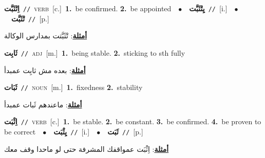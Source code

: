 \documentclass[10pt,a4paper,twoside]{article} %
\begin{document}
\begin{multicols}{2}
{\setlength\topsep{0pt}\textbf{\foreignlanguage{arabic}{اِتْثَبَّت}}\ {\color{gray}\texttt{//}\color{black}}\ \textsc{verb}\ [c.]\ \textbf{1.}~be confirmed.  \textbf{2.}~be appointed\ \ $\bullet$\ \ \setlength\topsep{0pt}\textbf{\foreignlanguage{arabic}{يِتْثَبَّت}}\ {\color{gray}\texttt{//}\color{black}}\ [i.]\ \ $\bullet$\ \ \setlength\topsep{0pt}\textbf{\foreignlanguage{arabic}{تْثَبَّت}}\ {\color{gray}\texttt{//}\color{black}}\ [p.]\  \begin{flushright}\color{gray}\foreignlanguage{arabic}{\textbf{\underline{\foreignlanguage{arabic}{أمثلة}}}: تْثَبَّتت بمدارس الوكالة}\end{flushright}\color{black}} \vspace{2mm}

{\setlength\topsep{0pt}\textbf{\foreignlanguage{arabic}{ثَابِت}}\ {\color{gray}\texttt{//}\color{black}}\ \textsc{adj}\ [m.]\ \textbf{1.}~being stable.  \textbf{2.}~sticking to sth fully\  \begin{flushright}\color{gray}\foreignlanguage{arabic}{\textbf{\underline{\foreignlanguage{arabic}{أمثلة}}}: بعده مش ثابِت عمبدأ}\end{flushright}\color{black}} \vspace{2mm}

{\setlength\topsep{0pt}\textbf{\foreignlanguage{arabic}{ثَبَات}}\ {\color{gray}\texttt{//}\color{black}}\ \textsc{noun}\ [m.]\ \textbf{1.}~fixedness  \textbf{2.}~stability\  \begin{flushright}\color{gray}\foreignlanguage{arabic}{\textbf{\underline{\foreignlanguage{arabic}{أمثلة}}}: ماعندهم ثَبات عمبدأ}\end{flushright}\color{black}} \vspace{2mm}

{\setlength\topsep{0pt}\textbf{\foreignlanguage{arabic}{اِثْبَت}}\ {\color{gray}\texttt{//}\color{black}}\ \textsc{verb}\ [c.]\ \textbf{1.}~be stable.  \textbf{2.}~be constant.  \textbf{3.}~be confirmed.  \textbf{4.}~be proven to be correct\ \ $\bullet$\ \ \setlength\topsep{0pt}\textbf{\foreignlanguage{arabic}{يِثْبَت}}\ {\color{gray}\texttt{//}\color{black}}\ [i.]\ \ $\bullet$\ \ \setlength\topsep{0pt}\textbf{\foreignlanguage{arabic}{ثَبَت}}\ {\color{gray}\texttt{//}\color{black}}\ [p.]\  \begin{flushright}\color{gray}\foreignlanguage{arabic}{\textbf{\underline{\foreignlanguage{arabic}{أمثلة}}}: اِثْبَت عمواقفك المشرفة حتى لو ماحدا وقف معك}\end{flushright}\color{black}} \vspace{2mm}


\end{multicols}
\end{document}
